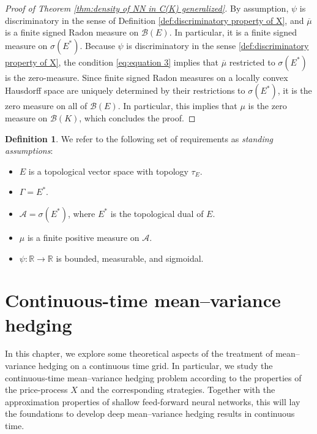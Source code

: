 \documentclass[11pt,a4paper,twoside,openany]{report}
\numberwithin{equation}{section}
\theoremstyle{plain} %
\theoremstyle{definition} %
\newtheorem{definition}[theorem]{Definition}
\theoremstyle{remark} %
\begin{document}
\begin{proof}[Proof of Theorem \ref{thm:density of NN in C(K) generalized}]
By assumption, \(\psi\) is discriminatory in the sense of Definition \ref{def:discriminatory property of X}, and \(\overline{\mu}\) is a finite signed Radon measure on \(\mathcal{B}(E)\). In particular, it is a finite signed measure on \(\sigma(E^*)\). Because \(\psi\) is discriminatory in the sense \ref{def:discriminatory property of X}, the condition \eqref{eq:equation 3}
    implies that \(\overline{\mu}\) restricted to \(\sigma(E^*)\) is the zero-measure. Since finite signed Radon measures on a locally convex Hausdorff space are uniquely determined by their restrictions to \(\sigma(E^*)\), it is the zero measure on all of \(\mathcal{B}(E)\). In particular, this implies that \(\mu\) is the zero measure on \(\mathcal{B}(K)\), which concludes the proof.
 \end{proof}

\begin{definition}\label{def:standing assumptions}
    We refer to the following set of requirements as \textit{standing assumptions}:
    \begin{itemize}
    \item \(E\) is a topological vector space with topology \(\tau_E\).
    \item \(\Gamma=E^*\).
    \item \(\mathcal{A}=\sigma(E^*)\), where \(E^*\) is the topological dual of \(E\).
    \item \(\mu\) is a finite positive measure on \(\mathcal{A}\).
    \item \(\psi:\mathbb{R}\to\mathbb{R}\) is bounded, measurable, and sigmoidal. 
\end{itemize}
\end{definition}


\chapter{Continuous-time mean--variance hedging}\label{ch:continuous time mean--variance hedging}
In this chapter, we explore some theoretical aspects of the treatment of mean–variance hedging on a continuous time grid. In particular, we study the continuous-time mean--variance hedging problem according to the properties of the price-process \(X\) and the corresponding strategies. Together with the approximation properties of shallow feed-forward neural networks, this will lay the foundations to develop deep mean--variance hedging results in continuous time.
\end{document}
